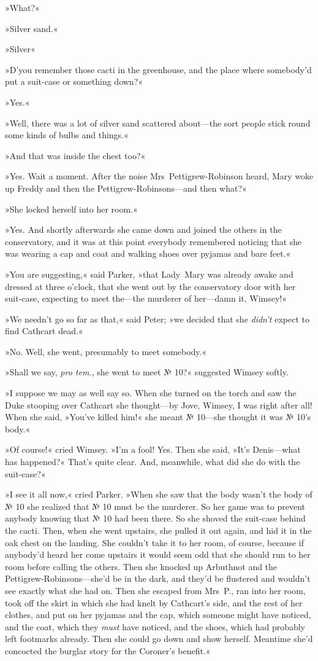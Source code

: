 »What?«

»Silver sand.«

»Silver\longdash«

»D'you remember those cacti in the greenhouse, and the place where somebody'd put a suit-case or something down?«

»Yes.«

»Well, there was a lot of silver sand scattered about—the sort people stick round some kinds of bulbs and things.«

»And that was inside the chest too?«

»Yes. Wait a moment. After the noise Mrs~Pettigrew-Robinson heard, Mary woke up Freddy and then the Pettigrew-Robinsons—and then what?«

»She locked herself into her room.«

»Yes. And shortly afterwards she came down and joined the others in the conservatory, and it was at this point everybody remembered noticing that she was wearing a cap and coat and walking shoes over pyjamas and bare feet.«

»You are suggesting,« said Parker, »that Lady~Mary was already awake and dressed at three o'clock, that she went out by the conservatory door with her suit-case, expecting to meet the—the murderer of her—damn it, Wimsey!«

»We needn't go so far as that,« said Peter; »we decided that she \textit{didn't} expect to find Cathcart dead.«

»No. Well, she went, presumably to meet somebody.«

»Shall we say, \textit{pro tem.}, she went to meet № 10?« suggested Wimsey softly.

»I suppose we may as well say so. When she turned on the torch and saw the Duke stooping over Cathcart she thought—by Jove, Wimsey, I was right after all! When she said, »You've killed him!« she meant № 10—she thought it was № 10's body.«

»Of course!« cried Wimsey. »I'm a fool! Yes. Then she said, »It's Denis—what has happened?« That's quite clear. And, meanwhile, what did she do with the suit-case?«

»I see it all now,« cried Parker. »When she saw that the body wasn't the body of № 10 she realized that № 10 must be the murderer. So her game was to prevent anybody knowing that № 10 had been there.  So she shoved the suit-case behind the cacti. Then, when she went upstairs, she pulled it out again, and hid it in the oak chest on the landing. She couldn't take it to her room, of course, because if anybody'd heard her come upstairs it would seem odd that she should run to her room before calling the others. Then she knocked up Arbuthnot and the Pettigrew-Robinsons—she'd be in the dark, and they'd be flustered and wouldn't see exactly what she had on. Then she escaped from Mrs~P\@., ran into her room, took off the skirt in which she had knelt by Cathcart's side, and the rest of her clothes, and put on her pyjamas and the cap, which someone might have noticed, and the coat, which they \textit{must} have noticed, and the shoes, which had probably left footmarks already. Then she could go down and show herself. Meantime she'd concocted the burglar story for the Coroner's benefit.«

